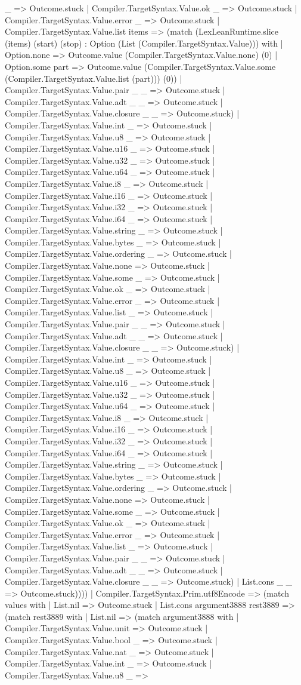\documentclass[11pt]{article}
\begin{document}
\_ => Outcome.stuck | Compiler.TargetSyntax.Value.ok \_ => Outcome.stuck | Compiler.TargetSyntax.Value.error \_ => Outcome.stuck | Compiler.TargetSyntax.Value.list items => (match (LexLeanRuntime.slice (items) (start) (stop) : Option (List (Compiler.TargetSyntax.Value))) with | Option.none => Outcome.value (Compiler.TargetSyntax.Value.none) (0) | Option.some part => Outcome.value (Compiler.TargetSyntax.Value.some (Compiler.TargetSyntax.Value.list (part))) (0)) | Compiler.TargetSyntax.Value.pair \_ \_ => Outcome.stuck | Compiler.TargetSyntax.Value.adt \_ \_ => Outcome.stuck | Compiler.TargetSyntax.Value.closure \_ \_ => Outcome.stuck) | Compiler.TargetSyntax.Value.int \_ => Outcome.stuck | Compiler.TargetSyntax.Value.u8 \_ => Outcome.stuck | Compiler.TargetSyntax.Value.u16 \_ => Outcome.stuck | Compiler.TargetSyntax.Value.u32 \_ => Outcome.stuck | Compiler.TargetSyntax.Value.u64 \_ => Outcome.stuck | Compiler.TargetSyntax.Value.i8 \_ => Outcome.stuck | Compiler.TargetSyntax.Value.i16 \_ => Outcome.stuck | Compiler.TargetSyntax.Value.i32 \_ => Outcome.stuck | Compiler.TargetSyntax.Value.i64 \_ => Outcome.stuck | Compiler.TargetSyntax.Value.string \_ => Outcome.stuck | Compiler.TargetSyntax.Value.bytes \_ => Outcome.stuck | Compiler.TargetSyntax.Value.ordering \_ => Outcome.stuck | Compiler.TargetSyntax.Value.none => Outcome.stuck | Compiler.TargetSyntax.Value.some \_ => Outcome.stuck | Compiler.TargetSyntax.Value.ok \_ => Outcome.stuck | Compiler.TargetSyntax.Value.error \_ => Outcome.stuck | Compiler.TargetSyntax.Value.list \_ => Outcome.stuck | Compiler.TargetSyntax.Value.pair \_ \_ => Outcome.stuck | Compiler.TargetSyntax.Value.adt \_ \_ => Outcome.stuck | Compiler.TargetSyntax.Value.closure \_ \_ => Outcome.stuck) | Compiler.TargetSyntax.Value.int \_ => Outcome.stuck | Compiler.TargetSyntax.Value.u8 \_ => Outcome.stuck | Compiler.TargetSyntax.Value.u16 \_ => Outcome.stuck | Compiler.TargetSyntax.Value.u32 \_ => Outcome.stuck | Compiler.TargetSyntax.Value.u64 \_ => Outcome.stuck | Compiler.TargetSyntax.Value.i8 \_ => Outcome.stuck | Compiler.TargetSyntax.Value.i16 \_ => Outcome.stuck | Compiler.TargetSyntax.Value.i32 \_ => Outcome.stuck | Compiler.TargetSyntax.Value.i64 \_ => Outcome.stuck | Compiler.TargetSyntax.Value.string \_ => Outcome.stuck | Compiler.TargetSyntax.Value.bytes \_ => Outcome.stuck | Compiler.TargetSyntax.Value.ordering \_ => Outcome.stuck | Compiler.TargetSyntax.Value.none => Outcome.stuck | Compiler.TargetSyntax.Value.some \_ => Outcome.stuck | Compiler.TargetSyntax.Value.ok \_ => Outcome.stuck | Compiler.TargetSyntax.Value.error \_ => Outcome.stuck | Compiler.TargetSyntax.Value.list \_ => Outcome.stuck | Compiler.TargetSyntax.Value.pair \_ \_ => Outcome.stuck | Compiler.TargetSyntax.Value.adt \_ \_ => Outcome.stuck | Compiler.TargetSyntax.Value.closure \_ \_ => Outcome.stuck) | List.cons \_ \_ => Outcome.stuck)))) | Compiler.TargetSyntax.Prim.utf8Encode => (match values with | List.nil => Outcome.stuck | List.cons argument3888 rest3889 => (match rest3889 with | List.nil => (match argument3888 with | Compiler.TargetSyntax.Value.unit => Outcome.stuck | Compiler.TargetSyntax.Value.bool \_ => Outcome.stuck | Compiler.TargetSyntax.Value.nat \_ => Outcome.stuck | Compiler.TargetSyntax.Value.int \_ => Outcome.stuck | Compiler.TargetSyntax.Value.u8 \_ => 
\end{document}
